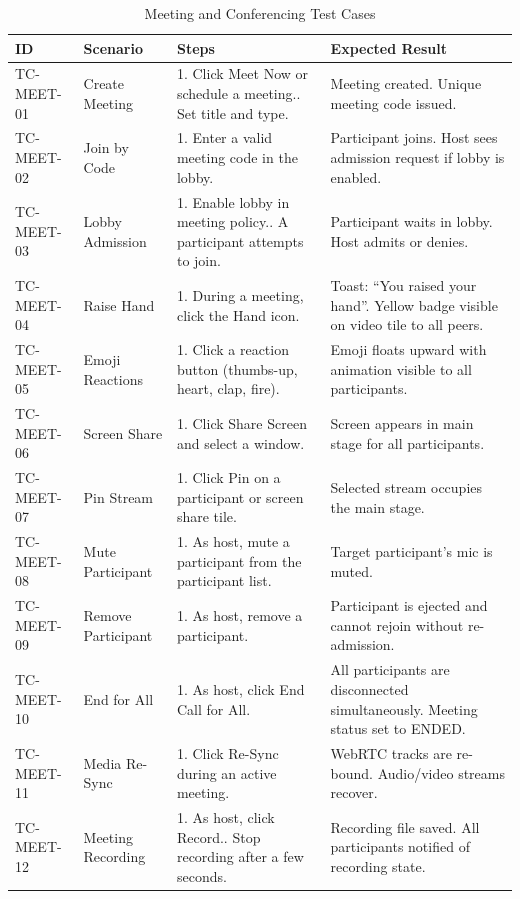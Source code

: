 \documentclass[11pt,a4paper]{report}
\begin{document}
\begin{xltabular}{\textwidth}{|L{2.5cm}|L{2.5cm}|X|L{3.5cm}|}
\caption{Meeting and Conferencing Test Cases} \\
\hline
{} \textbf{ID} & \textbf{Scenario} & \textbf{Steps} & \textbf{Expected Result} \\ \hline
\endhead

TC-MEET-01 & Create Meeting &
1. Click Meet Now or schedule a meeting.. Set title and type. &
Meeting created. Unique meeting code issued. \\ \hline

TC-MEET-02 & Join by Code &
1. Enter a valid meeting code in the lobby. &
Participant joins. Host sees admission request if lobby is enabled. \\ \hline

TC-MEET-03 & Lobby Admission &
1. Enable lobby in meeting policy.. A participant attempts to join. &
Participant waits in lobby. Host admits or denies. \\ \hline

TC-MEET-04 & Raise Hand &
1. During a meeting, click the Hand icon. &
Toast: ``You raised your hand''. Yellow badge visible on video tile to all peers. \\ \hline

TC-MEET-05 & Emoji Reactions &
1. Click a reaction button (thumbs-up, heart, clap, fire). &
Emoji floats upward with animation visible to all participants. \\ \hline

TC-MEET-06 & Screen Share &
1. Click Share Screen and select a window. &
Screen appears in main stage for all participants. \\ \hline

TC-MEET-07 & Pin Stream &
1. Click Pin on a participant or screen share tile. &
Selected stream occupies the main stage. \\ \hline

TC-MEET-08 & Mute Participant &
1. As host, mute a participant from the participant list. &
Target participant's mic is muted. \\ \hline

TC-MEET-09 & Remove Participant &
1. As host, remove a participant. &
Participant is ejected and cannot rejoin without re-admission. \\ \hline

TC-MEET-10 & End for All &
1. As host, click End Call for All. &
All participants are disconnected simultaneously. Meeting status set to ENDED. \\ \hline

TC-MEET-11 & Media Re-Sync &
1. Click Re-Sync during an active meeting. &
WebRTC tracks are re-bound. Audio/video streams recover. \\ \hline

TC-MEET-12 & Meeting Recording &
1. As host, click Record.. Stop recording after a few seconds. &
Recording file saved. All participants notified of recording state. \\ \hline
\end{xltabular}
\end{document}

